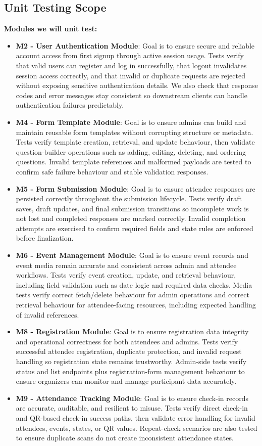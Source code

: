 \documentclass[12pt, titlepage]{article}
\begin{document}
\subsection{Unit Testing Scope}
\textbf{Modules we will unit test:}
\begin{itemize}
  \item \textbf{M2 - User Authentication Module}: Goal is to ensure secure and reliable account access from first signup through active session usage. Tests verify that valid users can register and log in successfully, that logout invalidates session access correctly, and that invalid or duplicate requests are rejected without exposing sensitive authentication details. We also check that response codes and error messages stay consistent so downstream clients can handle authentication failures predictably.
  \item \textbf{M4 - Form Template Module}: Goal is to ensure admins can build and maintain reusable form templates without corrupting structure or metadata. Tests verify template creation, retrieval, and update behaviour, then validate question-builder operations such as adding, editing, deleting, and ordering questions. Invalid template references and malformed payloads are tested to confirm safe failure behaviour and stable validation responses.
  \item \textbf{M5 - Form Submission Module}: Goal is to ensure attendee responses are persisted correctly throughout the submission lifecycle. Tests verify draft saves, draft updates, and final submission transitions so incomplete work is not lost and completed responses are marked correctly. Invalid completion attempts are exercised to confirm required fields and state rules are enforced before finalization.
  \item \textbf{M6 - Event Management Module}: Goal is to ensure event records and event media remain accurate and consistent across admin and attendee workflows. Tests verify event creation, update, and retrieval behaviour, including field validation such as date logic and required data checks. Media tests verify correct fetch/delete behaviour for admin operations and correct retrieval behaviour for attendee-facing resources, including expected handling of invalid references.
  \item \textbf{M8 - Registration Module}: Goal is to ensure registration data integrity and operational correctness for both attendees and admins. Tests verify successful attendee registration, duplicate protection, and invalid request handling so registration state remains trustworthy. Admin-side tests verify status and list endpoints plus registration-form management behaviour to ensure organizers can monitor and manage participant data accurately.
  \item \textbf{M9 - Attendance Tracking Module}: Goal is to ensure check-in records are accurate, auditable, and resilient to misuse. Tests verify direct check-in and QR-based check-in success paths, then validate error handling for invalid attendees, events, states, or QR values. Repeat-check scenarios are also tested to ensure duplicate scans do not create inconsistent attendance states.
\end{itemize}
\end{document}

